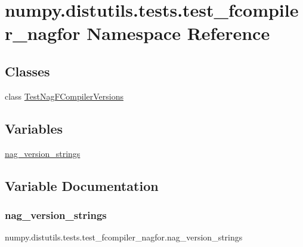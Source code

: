 \hypertarget{namespacenumpy_1_1distutils_1_1tests_1_1test__fcompiler__nagfor}{}\section{numpy.\+distutils.\+tests.\+test\+\_\+fcompiler\+\_\+nagfor Namespace Reference}
\label{namespacenumpy_1_1distutils_1_1tests_1_1test__fcompiler__nagfor}
\subsection*{Classes}
\begin{DoxyCompactItemize}
\item 
class \hyperlink{classnumpy_1_1distutils_1_1tests_1_1test__fcompiler__nagfor_1_1TestNagFCompilerVersions}{Test\+Nag\+F\+Compiler\+Versions}
\end{DoxyCompactItemize}
\subsection*{Variables}
\begin{DoxyCompactItemize}
\item 
\hyperlink{namespacenumpy_1_1distutils_1_1tests_1_1test__fcompiler__nagfor_af8ec71410fb701852bf1ea1a2b039a75}{nag\+\_\+version\+\_\+strings}
\end{DoxyCompactItemize}


\subsection{Variable Documentation}
\mbox{\label{namespacenumpy_1_1distutils_1_1tests_1_1test__fcompiler__nagfor_af8ec71410fb701852bf1ea1a2b039a75}} 
\subsubsection{\texorpdfstring{nag\+\_\+version\+\_\+strings}{nag\_version\_strings}}
{\footnotesize\ttfamily numpy.\+distutils.\+tests.\+test\+\_\+fcompiler\+\_\+nagfor.\+nag\+\_\+version\+\_\+strings}

